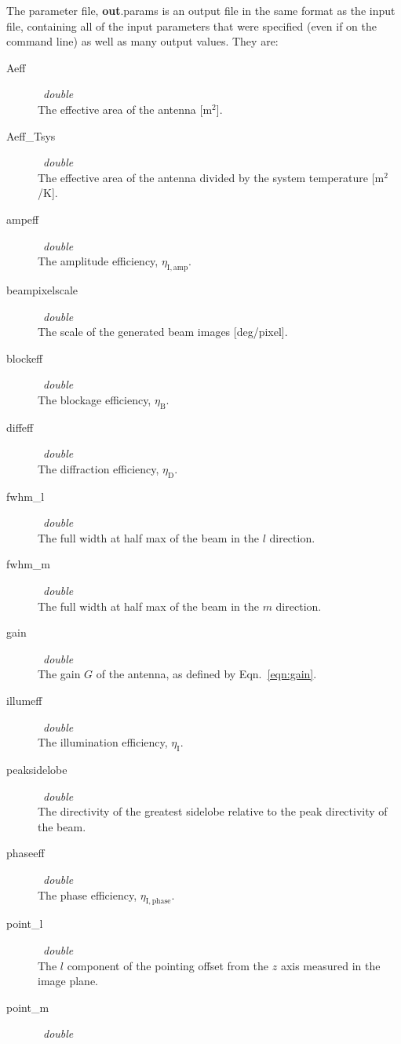 \documentclass{article}
\begin{document}
The parameter file, {\bf out}{.params} is an output file in the same format
as the input file, containing all of the input parameters that were 
specified (even if on the command line) as well as many output 
values.  They are:
\begin{description}
\item[Aeff] \ {\it double} \\
The effective area of the antenna [m$^2$].
\item[Aeff\_Tsys] \ {\it double} \\
The effective area of the antenna divided by the system temperature
[m$^2$/K].
\item[ampeff] \ {\it double} \\
The amplitude efficiency, $\eta_\mathrm{I,amp}$.
\item[beampixelscale] \ {\it double} \\
The scale of the generated beam images [deg/pixel].
\item[blockeff] \ {\it double} \\
The blockage efficiency, $\eta_\mathrm{B}$.
\item[diffeff] \ {\it double} \\
The diffraction efficiency, $\eta_\mathrm{D}$.
\item[fwhm\_l] \ {\it double} \\
The full width at half max of the beam in the $l$ direction.
\item[fwhm\_m] \ {\it double} \\
The full width at half max of the beam in the $m$ direction.
\item[gain] \ {\it double} \\
The gain $G$ of the antenna, as defined by Eqn.~\ref{eqn:gain}.
\item[illumeff] \ {\it double} \\
The illumination efficiency, $\eta_\mathrm{I}$.
\item[peaksidelobe] \ {\it double} \\
The directivity of the greatest sidelobe relative to the peak directivity
of the beam.
\item[phaseeff] \ {\it double} \\
The phase efficiency, $\eta_\mathrm{I,phase}$.
\item[point\_l] \ {\it double} \\
The $l$ component of the pointing offset from the $z$ axis 
measured in the image plane.
\item[point\_m] \ {\it double} \\

\end{description}
\end{document}
